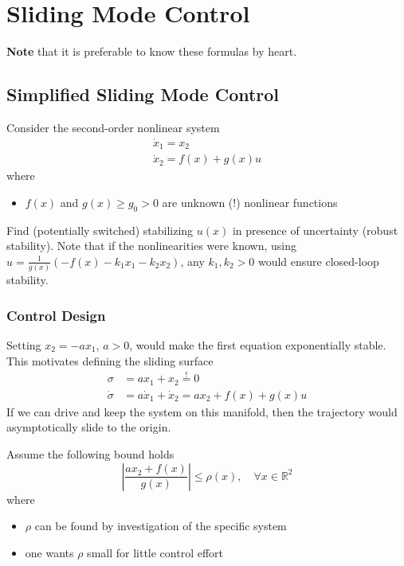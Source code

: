 \section{Sliding Mode Control}
\textbf{Note} that it is preferable to know these formulas by heart.
\subsection{Simplified Sliding Mode Control}
Consider the second-order nonlinear system
\begin{align*}
    \dot{x}_1 = x_2 \\
    \dot{x}_2 = f(x) + g(x)u
\end{align*}
where
\begin{itemize}
    \item $f(x)$ and $g(x) \geq g_0 > 0$ are unknown (!) nonlinear functions
\end{itemize}

\newpar{}

Find (potentially switched) stabilizing $u(x)$ in presence of uncertainty (robust stability).
\newpar{}
Note that if the nonlinearities were known, using $u = \frac{1}{g(x)}(-f(x) - k_1x_1 - k_2x_2)$, any $k_1, k_2 > 0$ would ensure closed-loop stability.

\subsubsection{Control Design}

Setting $x_2 = -ax_1$, $a > 0$, would make the first equation exponentially stable. This motivates defining the sliding surface
\begin{align*}
    \sigma       & = ax_1 + x_2 \stackrel{!}{=} 0                 \\
    \dot{\sigma} & = a\dot{x}_1 + \dot{x}_2 = ax_2 + f(x) + g(x)u
\end{align*}
If we can drive and keep the system on this manifold, then the trajectory would asymptotically slide to the origin.

\newpar{}

Assume the following bound holds
\begin{equation*}
    \left|\frac{ax_2 + f(x)}{g(x)}\right| \leq \rho(x), \quad \forall x \in \mathbb{R}^2
\end{equation*}
where
\begin{itemize}
    \item $\rho$ can be found by investigation of the specific system
    \item one wants $\rho$ small for little control effort
\end{itemize}

